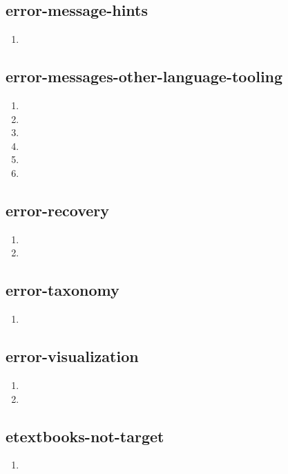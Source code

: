 \documentclass{article}
\begin{document}
\subsection{error-message-hints}
\begin{enumerate}
\item {}
\end{enumerate}

\subsection{error-messages-other-language-tooling}
\begin{enumerate}
\item {}
\item {}
\item {}
\item {}
\item {}
\item {}
\end{enumerate}

\subsection{error-recovery}
\begin{enumerate}
\item {}
\item {}
\end{enumerate}

\subsection{error-taxonomy}
\begin{enumerate}
\item {}
\end{enumerate}

\subsection{error-visualization}
\begin{enumerate}
\item {}
\item {}
\end{enumerate}

\subsection{etextbooks-not-target}
\begin{enumerate}
\item {}
\end{enumerate}
\end{document}
